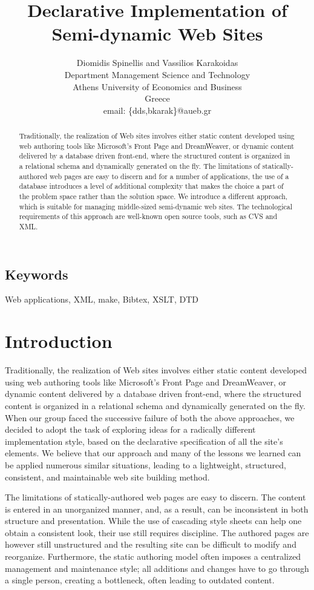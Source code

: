 \documentclass[10pt]{article}
\title{Declarative Implementation of Semi-dynamic Web Sites}
\author{Diomidis Spinellis and Vassilios Karakoidas\\
Department Management Science and Technology \\
Athens University of Economics and Business \\
Greece\\
email: \{dds,bkarak\}@aueb.gr}
\date{}
\begin{document}
\maketitle

\begin{abstract}
\noindent
Traditionally, the realization of Web sites involves either
static content developed using web authoring tools like
Microsoft's Front Page and DreamWeaver, or dynamic
content delivered by a database driven front-end,
where the structured content is organized
in a relational schema and dynamically generated on the fly.
The limitations of statically-authored web pages are easy to discern and
for a number of applications, the use of a database
introduces a level of additional complexity that
makes the choice a part of the problem space rather than the solution space.
We introduce a different approach, which is suitable for managing 
middle-sized semi-dynamic web sites. The technological requirements of this
approach are well-known open source tools, such as CVS and XML.
\end{abstract}

\subsection*{Keywords}
Web applications, XML, make, Bibtex, XSLT, DTD

\section{Introduction}
\label{sec:intro}
Traditionally, the realization of Web sites involves either
static content developed using web authoring tools like
Microsoft's Front Page and DreamWeaver, or dynamic
content delivered by a database driven front-end,
where the structured content is organized
in a relational schema and dynamically generated on the fly.
When our group faced the successive failure of both the above approaches,
we decided to adopt the task of exploring ideas for a radically different
implementation style, based on the declarative specification
of all the site's elements.
We believe that our approach and many of the lessons we learned
can be applied numerous similar situations,
leading to a lightweight, structured, consistent, and maintainable
web site building method.

The limitations of statically-authored web pages are easy to discern.
The content is entered in an unorganized manner, and, as a result,
can be inconsistent in both structure and presentation.
While the use of cascading style sheets can help one obtain a
consistent look, their use still requires discipline.
The authored pages are however still unstructured and the resulting
site can be difficult to modify and reorganize.
Furthermore, the static authoring model often imposes a centralized
management and maintenance style;
all additions and changes have to go through a single person,
creating a bottleneck, often leading to outdated content.
\end{document}
